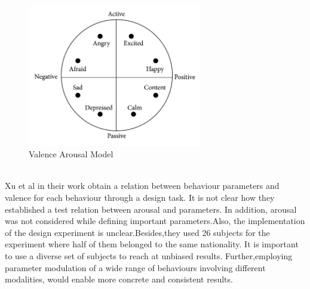 \documentclass[runningheads]{llncs}
\begin{document}
\begin{figure}
\centering
\includegraphics[width = 3in]{valence.png}
\caption{Valence Arousal Model}
\label{valence}
\end{figure}


\\
Xu et al \cite{joost} in their work obtain a relation between behaviour parameters  and valence for each behaviour through a design task. It is not clear how they established a test relation between arousal and parameters. In addition, arousal was not considered while defining important parameters.Also, the implementation of the design experiment is unclear.Besides,they used 26 subjects for the experiment where half of them belonged to the same nationality. It is important to use a diverse set of subjects to reach at unbiased results. Further,employing parameter modulation of a wide range of behaviours involving different modalities, would enable more concrete and consistent results.
\end{document}

